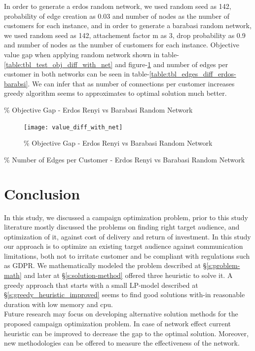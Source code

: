 \documentclass[11pt]{article}
\begin{document}
In order to generate a erdos random network, we used random seed as 142, probability of edge creation as 0.03 and number of nodes as the number of customers for each instance, and in order to generate a barabasi random network, we used random seed as 142, attachement factor m as 3, drop probability as 0.9 and number of nodes as the number of customers for each instance.
Objective value gap when applying random network shown in table-\ref{table:tbl_test_obj_diff_with_net} and figure-\ref{fig:fig_value_diff_with_net} and number of edges per customer in both networks can be seen in table-\ref{table:tbl_edges_diff_erdos-barabsi}. We can infer that as number of connections per customer increases greedy algorithm seems to approximates to optimal solution much better. 

\begin{table}[htb]
        \centering
        \caption[Short Caption for LoT]{\% Objective Gap - Erdos Renyi vs Barabasi Random Network }\label{table:tbl_test_obj_diff_with_net}
\end{table}
\begin{figure}[htp]
    \centering
    \texttt{[image: value\_diff\_with\_net]}
    \caption{\% Objective Gap  - Erdos Renyi vs Barabasi Random Network}
    \label{fig:fig_value_diff_with_net}
\end{figure}
\begin{table}[htb]
        \centering
        \caption[Short Caption for LoT]{\% Number of Edges per Customer - Erdos Renyi vs Barabasi Random Network }\label{table:tbl_edges_diff_erdos-barabsi}
\end{table}



\newpage

\section{Conclusion} \label{s:conclusion}
In this study, we discussed a campaign optimization problem, prior to this study literature mostly discussed the problems on finding right target audience, and optimization of it, against cost of delivery and return of investment. In this study our approach is to optimize an existing target audience against communication limitations, both not to irritate customer and be compliant with regulations such as GDPR. We mathematically modeled the problem described at \S \ref{s:problem-math} and later at \S \ref{s:solution-method} offered three heuristic to solve it. A greedy approach that starts with a small LP-model described at \S \ref{s:greedy_heuristic_improved} seems to find good solutions with-in reasonable duration with low memory and cpu.\\
Future research may focus on developing alternative solution methods for the proposed campaign optimization problem. In case of network effect current heuristic can be improved to decrease the gap to the optimal solution. Moreover, new methodologies can be offered to measure the effectiveness of the network.
\end{document}
